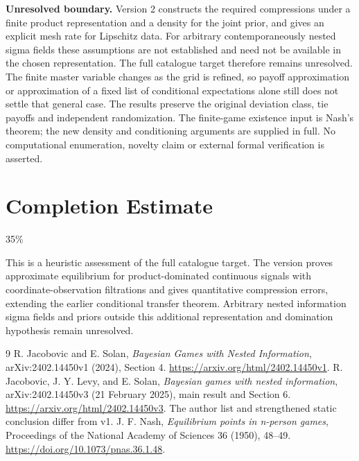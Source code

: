 \documentclass[11pt]{article}
\theoremstyle{remark}\newtheorem{remark}[theorem]{Remark}
\begin{document}
\textbf{Unresolved boundary.} Version 2 constructs the required compressions under a finite product representation and a density for the joint prior, and gives an explicit mesh rate for Lipschitz data. For arbitrary contemporaneously nested sigma fields these assumptions are not established and need not be available in the chosen representation. The full catalogue target therefore remains unresolved. The finite master variable changes as the grid is refined, so payoff approximation or approximation of a fixed list of conditional expectations alone still does not settle that general case. The results preserve the original deviation class, tie payoffs and independent randomization. The finite-game existence input is Nash's theorem; the new density and conditioning arguments are supplied in full. No computational enumeration, novelty claim or external formal verification is asserted.

\section{Completion Estimate}
35\%

This is a heuristic assessment of the full catalogue target. The version proves approximate equilibrium for product-dominated continuous signals with coordinate-observation filtrations and gives quantitative compression errors, extending the earlier conditional transfer theorem. Arbitrary nested information sigma fields and priors outside this additional representation and domination hypothesis remain unresolved.

\begin{thebibliography}{9}
 R. Jacobovic and E. Solan, \emph{Bayesian Games with Nested Information}, arXiv:2402.14450v1 (2024), Section 4. \url{https://arxiv.org/html/2402.14450v1}.
 R. Jacobovic, J. Y. Levy, and E. Solan, \emph{Bayesian games with nested information}, arXiv:2402.14450v3 (21 February 2025), main result and Section 6. \url{https://arxiv.org/html/2402.14450v3}. The author list and strengthened static conclusion differ from v1.
 J. F. Nash, \emph{Equilibrium points in n-person games}, Proceedings of the National Academy of Sciences 36 (1950), 48--49. \url{https://doi.org/10.1073/pnas.36.1.48}.
\end{thebibliography}
\end{document}
